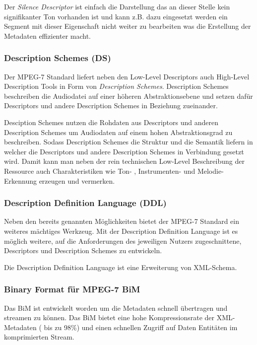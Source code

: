 	Der \emph{Silence Descriptor} ist einfach die Darstellung das an dieser Stelle kein signifikanter Ton vorhanden ist und kann z.B. dazu eingesetzt werden ein Segment mit dieser Eigenschaft nicht weiter zu bearbeiten was die Erstellung der Metadaten effizienter macht.

	\subsubsection{Description Schemes (DS)}
	Der MPEG-7 Standard liefert neben den Low-Level Descriptors auch High-Level Description Tools in Form von \emph{Description Schemes}. Description Schemes beschreiben die Audiodatei auf einer höheren Abstraktionsebene und setzen dafür Descriptors und andere Description Schemes in Beziehung zueinander.
		
		Desciption Schemes nutzen die Rohdaten aus Descriptors und anderen Description Schemes um Audiodaten auf einem hohen Abstraktionsgrad zu beschreiben. Sodass Description Schemes die Struktur und die Semantik liefern in welcher die Descriptors und andere Description Schemes in Verbindung gesetzt wird. Damit kann man neben der rein technischen Low-Level Beschreibung der Ressource auch Charakteristiken wie Ton- , Instrumenten- und Melodie-Erkennung erzeugen und vermerken. 
				
	\subsubsection{Description Definition Language (DDL)}
Neben den bereits genannten Möglichkeiten bietet der MPEG-7 Standard ein weiteres mächtiges Werkzeug. Mit der Description Definition Language ist es möglich weitere, auf die Anforderungen des jeweiligen Nutzers zugeschnittene, Descriptors und Description Schemes zu entwickeln.

	Die Description Definition Language ist eine Erweiterung von XML-Schema.

	\subsubsection{Binary Format für MPEG-7 BiM}
	Das BiM ist entwickelt worden um die Metadaten schnell übertragen und streamen zu können. Das BiM bietet eine hohe Kompressionsrate der XML-Metadaten ( bis zu 98\%) und einen schnellen Zugriff auf Daten Entitäten im komprimierten Stream.

